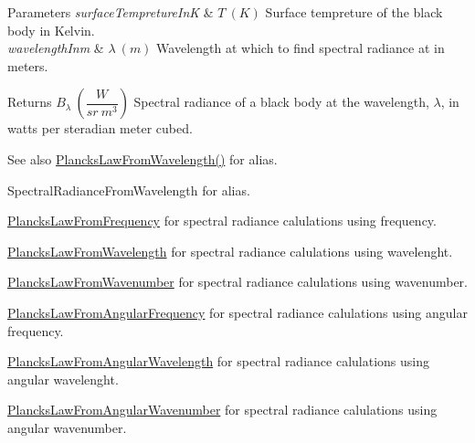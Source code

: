 \begin{DoxyParams}{Parameters}
{\em surface\+Tempreture\+InK} & $T\ (K)$ Surface tempreture of the black body in Kelvin. \\
\hline
{\em wavelength\+Inm} & $\lambda\ (m)$ Wavelength at which to find spectral radiance at in meters. \\
\hline
\end{DoxyParams}
\begin{DoxyReturn}{Returns}
$B_{\lambda}\ ( \dfrac{W}{sr\ m^3})$ Spectral radiance of a black body at the wavelength, $\lambda$, in watts per steradian meter cubed. 
\end{DoxyReturn}
\begin{DoxySeeAlso}{See also}
\mbox{\hyperlink{group___e_g_x_phys-_electrodynamics-_black_body-_plancks_law_ga54639bc031ded51ef78aa82b0457a4dd}{Plancks\+Law\+From\+Wavelength()}} for alias. 

Spectral\+Radiance\+From\+Wavelength for alias. 

\mbox{\hyperlink{group___e_g_x_phys-_electrodynamics-_black_body-_plancks_law_ga68aae82f8a086831358c4a61c8c80ba4}{Plancks\+Law\+From\+Frequency}} for spectral radiance calulations using frequency. 

\mbox{\hyperlink{group___e_g_x_phys-_electrodynamics-_black_body-_plancks_law_ga54639bc031ded51ef78aa82b0457a4dd}{Plancks\+Law\+From\+Wavelength}} for spectral radiance calulations using wavelenght. 

\mbox{\hyperlink{group___e_g_x_phys-_electrodynamics-_black_body-_plancks_law_ga6648ae2a0fbff6735c1e1a04c7cac746}{Plancks\+Law\+From\+Wavenumber}} for spectral radiance calulations using wavenumber. 

\mbox{\hyperlink{group___e_g_x_phys-_electrodynamics-_black_body-_plancks_law_gaac540560c71e30c02b91d22e417b5863}{Plancks\+Law\+From\+Angular\+Frequency}} for spectral radiance calulations using angular frequency. 

\mbox{\hyperlink{group___e_g_x_phys-_electrodynamics-_black_body-_plancks_law_ga7322124727f968d28807e918c5eeb23f}{Plancks\+Law\+From\+Angular\+Wavelength}} for spectral radiance calulations using angular wavelenght. 

\mbox{\hyperlink{group___e_g_x_phys-_electrodynamics-_black_body-_plancks_law_gaa3d3e0fdb77d25bdd40523f9975de902}{Plancks\+Law\+From\+Angular\+Wavenumber}} for spectral radiance calulations using angular wavenumber. 
\end{DoxySeeAlso}
\mbox{\label{group___e_g_x_phys-_electrodynamics-_black_body-_plancks_law_gaac540560c71e30c02b91d22e417b5863}} 
